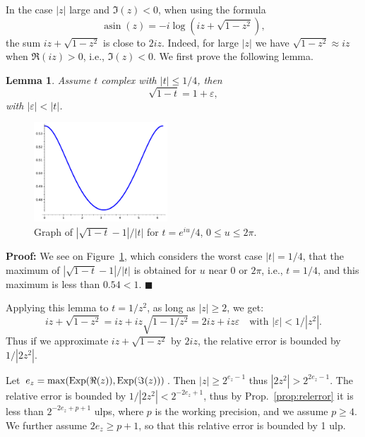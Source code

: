 \documentclass [11pt]{article}
\DeclareMathOperator{\Exp}{\operatorname {Exp}}
\newcommand {\asin}{\operatorname {asin}}
\renewcommand {\epsilon}{\varepsilon}
\renewcommand {\leq}{\leqslant}
\newtheorem{lemma}[theorem]{Lemma}
\newenvironment{proof}{\noindent \textbf {Proof:}}{{\hspace* {\fill}$\blacksquare$}}
\begin{document}
In the case $|z|$ large and $\Im(z) < 0$, when using the formula
\[ \asin(z) = -i \log (iz + \sqrt{1-z^2}), \]
the sum $iz + \sqrt{1-z^2}$ is close to $2iz$.
Indeed, for large $|z|$ we have $\sqrt{1-z^2} \approx iz$ when
$\Re(iz) > 0$, i.e., $\Im(z) < 0$.
We first prove the following lemma.
\begin{lemma} \label{lemma17}
  Assume $t$ complex with $|t| \leq 1/4$, then
  \[ \sqrt{1-t} = 1 + \varepsilon, \]
  with $|\varepsilon| < |t|$.
\end{lemma}
\begin{figure}[htp]

  \centerline{\includegraphics[width=5cm]{fig_lemma17.pdf}}
  \caption{Graph of $|\sqrt{1-t}-1|/|t|$ for
    $t = e^{iu}/4$, $0 \le u \le 2\pi$.} \label{fig_lemma17}
\end{figure}  

\begin{proof}
  We see on Figure~\ref{fig_lemma17}, which considers the worst case
  $|t| = 1/4$, that the maximum of $|\sqrt{1-t}-1|/|t|$
  is obtained for $u$ near $0$ or $2\pi$,
  i.e., $t = 1/4$, and this maximum is less than $0.54 < 1$.
\end{proof}

Applying this lemma to $t = 1/z^2$, as long as $|z| \ge 2$, we get:
\[ iz + \sqrt{1-z^2} = iz + iz \sqrt{1-1/z^2}
  = 2iz + iz \epsilon \quad
  \mbox{with $|\varepsilon| < 1/|z^2|$.} \]
Thus if we approximate $iz + \sqrt{1-z^2}$ by $2iz$,
the relative error is bounded by $1/|2z^2|$.

Let $e_z = {\rm max}(\Exp(\Re(z)),\Exp(\Im(z)))$.
Then $|z| \ge 2^{e_z-1}$ thus $|2z^2| > 2^{2e_z-1}$.
The relative error is bounded by $1/|2z^2| < 2^{-2e_z+1}$,
thus by Prop.~\ref{prop:relerror} it is less than $2^{-2e_z+p+1}$ ulps,
where $p$ is the working precision, and we assume $p \ge 4$.
We further assume $2e_z \ge p+1$, so that this relative error is bounded
by 1 ulp.
\end{document}
